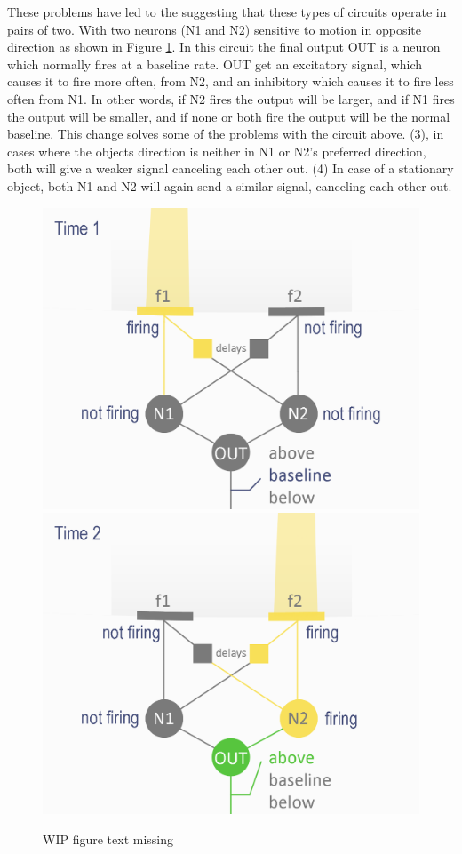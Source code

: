 \documentclass[11pt,a4paper,oneside,table,xcdraw]{article}
\begin{document}
These problems have led to the suggesting that these types of circuits operate in pairs of two. With two neurons (N1 and N2) sensitive to motion in opposite direction as shown in Figure \ref{fig:final}. In this circuit the final output OUT is a neuron which normally fires at a baseline rate. OUT get an excitatory signal, which causes it to fire more often, from N2, and an inhibitory which causes it to fire less often from N1. In other words, if N2 fires the output will be larger, and if N1 fires the output will be smaller, and if none or both fire the output will be the normal baseline. This change solves some of the problems with the circuit above. (3), in cases where the objects direction is neither in N1 or N2's preferred direction, both will give a weaker signal canceling each other out. (4) In case of a stationary object, both N1 and N2 will again send a similar signal, canceling each other out.
\begin{figure}[H]
\begin{multicols}{2}
\includegraphics[width=1\linewidth]{figure/model5.png}
\columnbreak
\includegraphics[width=1\linewidth]{figure/model6.png}
\end{multicols}
\caption{WIP figure text missing}
\label{fig:final}
\end{figure}
\end{document}
